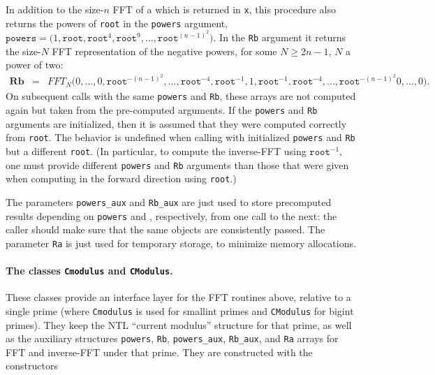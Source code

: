 \documentclass[14pt]{extarticle}
\begin{document}
In addition to the size-$n$ FFT of a which is returned in \texttt{x},
this procedure also returns the powers of \texttt{root} in the
\texttt{powers} argument,
$\mathtt{powers} = \big(1, \mathtt{root}, \mathtt{root}^4, \mathtt{root}^9, 
\ldots, \mathtt{root}^{(n-1)^2}\big).$
In the \texttt{Rb} argument it returns the size-$N$ FFT representation
of the negative powers, for some $N \ge 2n-1$, $N$ a power of two:
\begin{eqnarray*}
\mathbf{Rb} &=& FFT_N\big(0,\ldots,0,
  \mathtt{root}^{-(n-1)^2},\ldots,\mathtt{root}^{-4},\mathtt{root}^{-1},
  1, \mathtt{root}^{-1}, \mathtt{root}^{-4},\ldots,\mathtt{root}^{-(n-1)^2}
  0,\ldots,0\big).
\end{eqnarray*}
On subsequent calls with the same \texttt{powers} and \texttt{Rb},
these arrays are not computed again but taken from the pre-computed
arguments. If the \texttt{powers} and \texttt{Rb} arguments are
initialized, then it is assumed that they were computed correctly from
\texttt{root}. The behavior is undefined when calling with initialized
\texttt{powers} and \texttt{Rb} but a different \texttt{root}.
(In particular, to compute the inverse-FFT using $\mathtt{root}^{-1}$,
one must provide different \texttt{powers} and \texttt{Rb} arguments
than those that were given when computing in the forward direction
using \texttt{root}.)

The parameters \texttt{powers\_aux} and \texttt{Rb\_aux} are just used to store 
precomputed results depending on \texttt{powers} and , respectively, 
from one call to the next: the caller should make sure that 
the same objects are consistently passed. 
The parameter \texttt{Ra} is just used for temporary storage,
to minimize memory allocations.


\paragraph{The classes \texttt{Cmodulus} and \texttt{CModulus}.}
These classes provide an interface layer for the FFT routines above,
relative to a single prime (where \texttt{Cmodulus} is used for
smallint primes and \texttt{CModulus} for bigint primes). They keep
the NTL ``current modulus'' structure for that prime, as well as the
auxiliary structures
\texttt{powers}, \texttt{Rb}, \texttt{powers\_aux},
\texttt{Rb\_aux}, and \texttt{Ra} arrays for FFT and inverse-FFT under
that prime. They are constructed with the constructors
\end{document}
